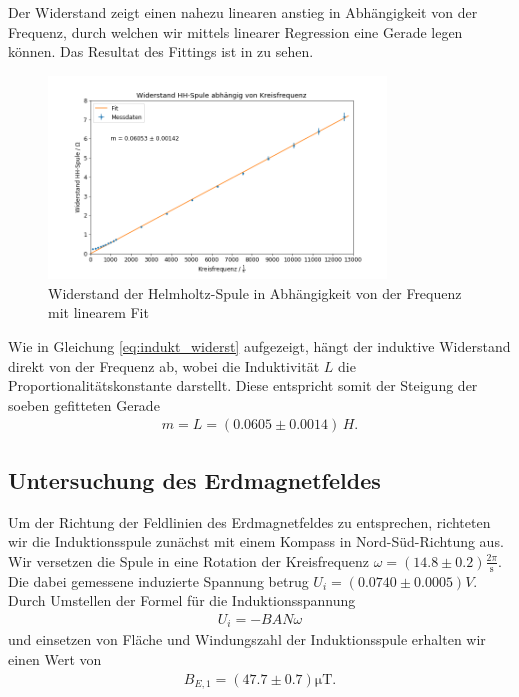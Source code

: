 Der Widerstand zeigt einen nahezu linearen anstieg in Abhängigkeit von der Frequenz, durch welchen wir mittels linearer Regression eine Gerade legen können. Das Resultat des Fittings ist in  zu sehen.

\begin{figure}[H]
    \centering
    \includegraphics[width=0.8\textwidth]{files/rhh_by_f_fit.png}
    \caption{Widerstand der Helmholtz-Spule in Abhängigkeit von der Frequenz mit linearem Fit}
    \label{plot:rhh_by_f_fit}
\end{figure}

Wie in Gleichung \ref{eq:indukt_widerst} aufgezeigt, hängt der induktive Widerstand direkt von der Frequenz ab, wobei die Induktivität $L$ die Proportionalitätskonstante darstellt. Diese entspricht somit der Steigung der soeben gefitteten Gerade
\begin{align}
    m = L = (0.0605 \pm 0.0014)\, \si{H}.
\end{align}

\subsection{Untersuchung des Erdmagnetfeldes}

Um der Richtung der Feldlinien des Erdmagnetfeldes zu entsprechen, richteten wir die Induktionsspule zunächst mit einem Kompass in Nord-Süd-Richtung aus. Wir versetzen die Spule in eine Rotation der Kreisfrequenz $\omega = (14.8 \pm 0.2) \frac{2\pi}{\si{\second}}$. Die dabei gemessene induzierte Spannung betrug $U_i = (0.0740 \pm 0.0005) \si{V}$. Durch Umstellen der Formel für die Induktionsspannung
\begin{align}
    U_i = -BAN\omega
\end{align}
und einsetzen von Fläche und Windungszahl der Induktionsspule erhalten wir einen Wert von
\begin{align}
    B_{E,1} = (47.7 \pm 0.7)\unit{\micro\tesla}.
\end{align}

